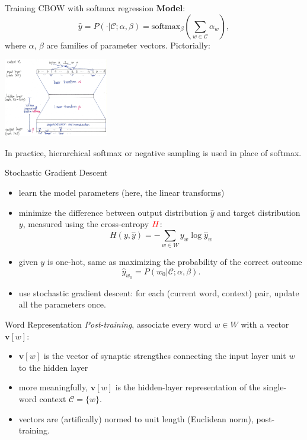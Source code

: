 \documentclass{beamer}
\newcommand{\wordvec}[1]{\textbf{v}[#1]}
\newcommand{\softmax}{\text{softmax}}
\newcommand{\currentword}{{w_0}}
\newcommand{\context}{\mathcal{C}}
\newcommand{\vocabulary}{W}
\newcommand{\p}{P}
\newcommand{\crossentropy}{H}
\newcommand{\prediction}{\hat{y}}
\newcommand{\target}{y}
\newcommand{\smparam}{\beta}
\begin{document}
\begin{frame}{Training CBOW with softmax regression}
	\textbf{Model}: $$\prediction = \p ( \cdot | \context ; \alpha, \smparam) = \softmax_\smparam (\sum_{w \in \context} \alpha_w), $$ where $\alpha$, $\smparam$ are families of parameter vectors.  Pictorially:
\begin{center}
\includegraphics[height=130px]{cbow}
\end{center}
In practice, hierarchical softmax or negative sampling is used in place of softmax.
\end{frame}

\begin{frame}{Stochastic Gradient Descent}
\begin{itemize}
\item learn the model parameters (here, the linear transforms)
\item minimize the difference between output distribution $\prediction$ and target distribution $\target$, measured using the cross-entropy $\textcolor{red}{\crossentropy}$:
	$$ \crossentropy (\target, \prediction) = - \sum_{w \in \vocabulary} \target_w \log \prediction_w $$
\item given $\target$ is one-hot, same as maximizing the probability of the correct outcome 
	$$\prediction_\currentword = \p (\currentword | \context ; \alpha, \smparam).$$
\item use stochastic gradient descent: for each (current word, context) pair, update all the parameters once.
\end{itemize}
\end{frame}

\begin{frame}{Word Representation}
\textit{Post-training}, associate every word $w \in \vocabulary$ with a vector $\wordvec w$:
\begin{itemize}
\item $\wordvec w$ is the vector of synaptic strengthes connecting the input layer unit $w$ to the hidden layer
\item more meaningfully, $\wordvec w$ is the hidden-layer representation of the single-word context $\context = \{w\}$.
\item vectors are (artifically) normed to unit length (Euclidean norm), post-training.
\end{itemize}
\end{frame}
\end{document}
